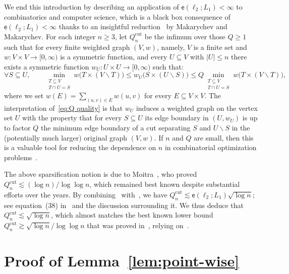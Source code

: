 \documentclass[11pt,reqno]{amsart}
\renewcommand{\le}{\leqslant}
\renewcommand{\ge}{\geqslant}
\renewcommand{\setminus}{\smallsetminus}
\renewcommand{\subset}{\subseteq}
\newcommand{\ee}{\mathsf{e}}
\begin{document}
We end this introduction by describing an application of $\ee(\ell_2;L_1)<\infty$ to combinatorics and computer science, which is a black box consequence of $\ee(\ell_2;L_1)<\infty$ thanks to an insightful reduction~\cite{MM16} by Makarychev and Makarychev. For each integer $n\ge 3$, let  $Q^{\mathrm{cut}}_n$ be the infimum over those $Q\ge 1$ such that for every finite weighted graph $(V,w)$, namely, $V$ is a finite set and $w:V\times V\to [0,\infty)$ is a symmetric function, and every $U\subset V$ with $|U|\le n$ there exists a symmetric function $w_U:U\times U\to [0,\infty)$  such that:
\begin{equation}\label{eq:Q quality}
\forall S\subset U,\qquad \min_{\substack{T\subset V\\ T\cap U=S}} w\big(T\times (V\setminus T)\big)\le w_U\big(S\times (U\setminus S)\big)\le Q \min_{\substack{T\subset V\\ T\cap U=S}} w\big(T\times (V\setminus T)\big),
\end{equation}
where we set $w(E)=\sum_{(u,v)\in E} w(u,v)$ for every $E\subset V\times V$. The interpretation of~\eqref{eq:Q quality} is that $w_U$ induces a weighted graph on the vertex set $U$ with the property that for { every}  $S\subset U$ its edge boundary in  $(U,w_U)$ is up to factor $Q$ the  minimum edge boundary of  a cut separating $S$ and $U\setminus S$ in the (potentially much larger) original graph $(V,w)$. If $n$ and $Q$ are small, then this is a valuable tool for reducing the dependence on $n$ in combinatorial optimization problems~\cite{Moi09,LM10,CLLM10,EGKRTT14}. 

The above sparsification notion is due to Moitra~\cite{Moi09}, who proved $Q_n^{\mathrm{cut}}\lesssim (\log n)/\log\log n$, which remained best known despite substantial efforts over the years. By combining~\cite{MM16} with~\cite{CNR25}, we have $Q_n^{\mathrm{cut}} \lesssim \ee(\ell_2;L_1)\sqrt{\log n}$; see equation~(38) in~\cite{CNR25} and the discussion surrounding it. We thus deduce that $Q_n^{\mathrm{cut}} \lesssim \sqrt{\log n}$, which almost matches the best known lower bound $Q_n^{\mathrm{cut}} \gtrsim \sqrt{\log n}/\log\log n$ that was proved in~\cite{MM16}, relying  on~\cite{FJS88}. 





\section{Proof of Lemma~\ref{lem:point-wise}}\label{sec:poitwise}  
\end{document}
